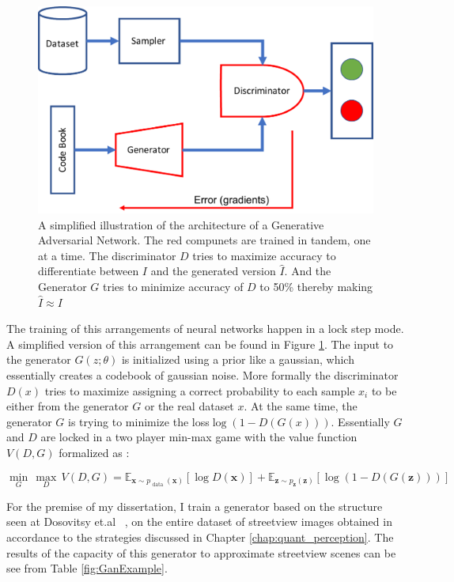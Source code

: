 \begin{figure}[ht!]
    \centering
    \includegraphics[width=0.7\columnwidth]{GAN_arch.pdf}
    \caption{A simplified illustration of the architecture of a Generative Adversarial Network. The red compunets are trained in tandem, one at a time. The discriminator $D$ tries to maximize accuracy to differentiate between $I$ and the generated version $\hat{I}$. And the Generator $G$ tries to minimize accuracy of $D$ to 50\% thereby making $\hat{I}\approx I$}
    \label{fig:GAN_arch}
\end{figure}

The training of this arrangements of neural networks happen in a lock step mode. 
A simplified version of this arrangement can be found in Figure \ref{fig:GAN_arch}.
The input to the generator $G(z;\theta)$ is initialized using a prior like a gaussian, which essentially creates a codebook of gaussian noise. More formally the discriminator $D(x)$ tries to maximize assigning a correct probability to each sample $x_i$ to be either from the generator $G$ or the real dataset $x$. At the same time, the generator $G$ is trying to minimize the loss$\log(1-D(G(x)))$. Essentially $G$ and $D$ are locked in a two player min-max game with the value function $V(D,G)$ formalized as :

\begin{equation}
\min _{G} \, \max _{D} \, V(D, G)=\mathbb{E}_{\boldsymbol{x} \sim p_{\text { data }}(\boldsymbol{x})}[\log D(\boldsymbol{x})]+\mathbb{E}_{\boldsymbol{z} \sim p_{\boldsymbol{z}}(\boldsymbol{z})}[\log (1-D(G(\boldsymbol{z})))]
\end{equation}

For the premise of my dissertation, I train a generator based on the structure seen at Dosovitsy et.al ~\cite{dosovitskiy2016generating}, on the entire dataset of streetview images obtained in accordance to the strategies discussed in Chapter \ref{chap:quant_perception}. The results of the capacity of this generator to approximate streetview scenes can be see from Table \ref{fig:GanExample}.




